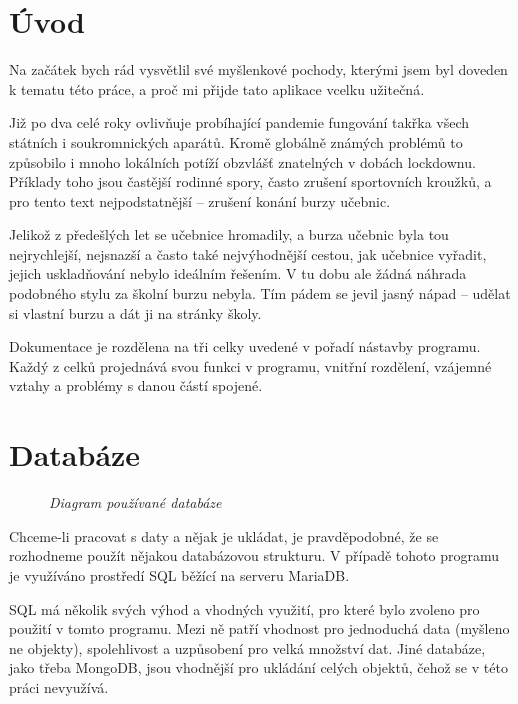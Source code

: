 \documentclass[a4paper,oneside,12pt]{report}
\begin{document}


\tableofcontents

\chapter*{Úvod}
Na začátek bych rád vysvětlil své myšlenkové pochody, kterými jsem byl doveden k tematu
této práce, a proč mi přijde tato aplikace vcelku užitečná.

Již po dva celé roky ovlivňuje probíhající pandemie fungování takřka všech státních i
soukromnických aparátů. Kromě globálně známých problémů to způsobilo i mnoho lokálních
potíží obzvlášť znatelných v dobách lockdownu. Příklady toho jsou častější rodinné spory,
často zrušení sportovních kroužků, a pro tento text nejpodstatnější -- zrušení konání
burzy učebnic.

Jelikož z předešlých let se učebnice hromadily, a burza učebnic byla tou nejrychlejší,
nejsnazší a často také nejvýhodnější cestou, jak učebnice vyřadit, jejich uskladňování
nebylo ideálním řešením. V tu dobu ale žádná náhrada podobného stylu za školní burzu
nebyla. Tím pádem se jevil jasný nápad -- udělat si vlastní burzu a dát ji na stránky
školy.

\vspace{1em}
Dokumentace je rozdělena na tři celky uvedené v pořadí nástavby programu. Každý z celků
projednává svou funkci v programu, vnitřní rozdělení, vzájemné vztahy a problémy s danou
částí spojené.


\chapter{Databáze}
\begin{figure}
	\vspace{-2.5mm}
	\def\svgwidth{\columnwidth}\scalebox{0.5}{}
	\caption{\textit{Diagram používané databáze}}\label{fig:ER_Diagram}
\end{figure}

Chceme-li pracovat s daty a nějak je ukládat, je pravděpodobné, že se rozhodneme použít
nějakou databázovou strukturu. V případě tohoto programu je využíváno prostředí SQL běžící
na serveru MariaDB.

SQL má několik svých výhod a vhodných využití, pro které bylo zvoleno pro použití v tomto
programu. Mezi ně patří vhodnost pro jednoduchá data (myšleno ne objekty), spolehlivost a
uzpůsobení pro velká množství dat. Jiné databáze, jako třeba MongoDB, jsou vhodnější pro
ukládání celých objektů, čehož se v této práci nevyužívá.
\end{document}
